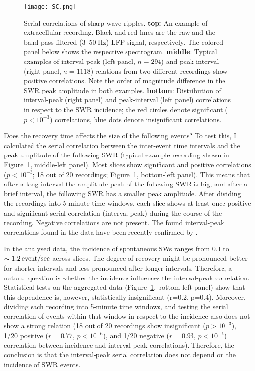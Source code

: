    \begin{figure}
      \centering
      \texttt{[image: SC.png]}
      \caption{Serial correlations of sharp-wave ripples.
        \textbf{top:} An example of extracellular recording. Black and red lines
        are the raw and the band-pass filtered (3--50 Hz) LFP signal,
        respectively. The colored panel below shows the respective spectrogram.
        \textbf{middle:} Typical examples of interval-peak (left panel, $n=294$) and peak-interval
        (right panel, $n=1118$) relations from two different recordings show positive
        correlations. Note the order of magnitude difference in the SWR peak
        amplitude in both examples.
        \textbf{bottom}: Distribution of interval-peak (right panel) and
        peak-interval (left panel) correlations in respect to the SWR
        incidence; the red circles denote significant ($p<10^{-3}$)
        correlations, blue dots denote insignificant correlations.
             }
      \label{fig:sc}
    \end{figure}
  
    Does the recovery time affects the size of the following events? To test
    this, I calculated the serial correlation between the inter-event time
    intervals and the peak amplitude of the following SWR (typical example
    recording shown in Figure~\ref{fig:sc}, middle-left panel). Most slices
    show significant and positive correlations ($p<10^{-3}$; 18 out of 20
    recordings; Figure~\ref{fig:sc}, bottom-left panel). This means that after
    a long interval the amplitude peak of the following SWR is big, and after a
    brief interval, the following SWR has a smaller peak amplitude. After
    dividing the recordings into 5-minute time windows, each slice shows at
    least once positive and significant serial correlation (interval-peak)
    during the course of the recording. Negative correlations are not present.
    The found interval-peak correlations found in the data have been recently
    confirmed by \cite{Kohus2016}.

    In the analysed data, the incidence of spontaneous SWs ranges from 0.1 to
    $\sim 1.2 \,\rm event/sec$ across slices. The degree of recovery might be
    pronounced better for shorter intervals and less pronounced after longer
    intervals. Therefore, a natural question is whether the incidence
    influences the interval-peak correlation. Statistical tests on the
    aggregated data (Figure~\ref{fig:sc}, bottom-left panel) show that this
    dependence is, however, statistically insignificant (r=0.2, p=0.4). Moreover,
    dividing each recording into 5-minute time windows, and testing the serial
    correlation of events within that window in respect to the incidence also
    does not show a strong relation (18 out of 20 recordings show insignificant
    ($p>10^{-3}$), 1/20 positive ($r=0.77 ,\, p<10^{-6}$), and 1/20 negative
    ($r=0.93,\,p<10^{-6}$) correlation between incidence and interval-peak
    correlations). Therefore, the conclusion is that the interval-peak serial
    correlation does not depend on the incidence of SWR events.

